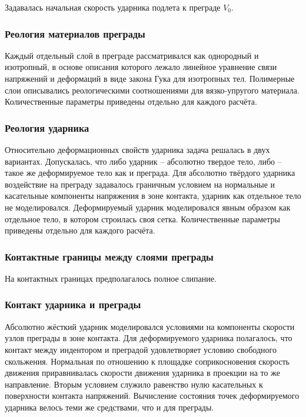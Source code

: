 Задавалась начальная скорость ударника подлета к преграде $V_0$.

\subsubsection*{Реология материалов преграды}

Каждый отдельный слой в преграде рассматривался как однородный и изотропный, в основе описания которого лежало линейное уравнение связи напряжений и деформаций в виде закона Гука для изотропных тел. Полимерные слои описывались реологическими соотношениями для вязко-упругого материала. Количественные параметры приведены отдельно для каждого расчёта.

\subsubsection*{Реология ударника}

Относительно деформационных свойств ударника задача решалась в двух вариантах. Допускалась, что либо ударник -- абсолютно твердое тело, либо -- такое же деформируемое тело как и преграда. Для абсолютно твёрдого ударника воздействие на преграду задавалось граничным условием на нормальные и касательные компоненты напряжения в зоне контакта, ударник как отдельное тело не моделировался. Деформируемый ударник моделировался явным образом как отдельное тело, в котором строилась своя сетка. Количественные параметры приведены отдельно для каждого расчёта.

\subsubsection*{Контактные границы между слоями преграды}

На контактных границах предполагалось полное слипание.

\subsubsection*{Контакт ударника и преграды}

Абсолютно жёсткий ударник моделировался условиями на компоненты скорости узлов преграды в зоне контакта. Для деформируемого ударника полагалось, что контакт между индентором и преградой удовлетворяет условию свободного скольжения. Нормальная по отношению к площадке соприкосновения скорость движения приравнивалась скорости движения ударника в проекции на то же направление. Вторым условием служило равенство нулю касательных к поверхности контакта напряжений. Вычисление состояния точек деформируемого ударника велось теми же средствами, что и для преграды.

